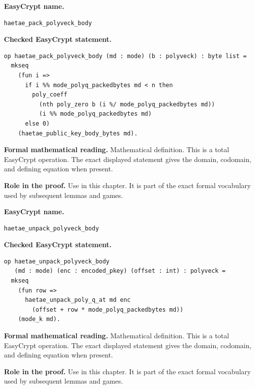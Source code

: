\begin{formaldefinition}
\noindent\textbf{EasyCrypt name.}
\begin{lstlisting}[language=EasyCrypt,basicstyle=\ttfamily\scriptsize]
haetae_pack_polyveck_body
\end{lstlisting}
\noindent\textbf{Checked EasyCrypt statement.}
\begin{lstlisting}[language=EasyCrypt,basicstyle=\ttfamily\scriptsize]
op haetae_pack_polyveck_body (md : mode) (b : polyveck) : byte list =
  mkseq
    (fun i =>
      if i %% mode_polyq_packedbytes md < n then
        poly_coeff
          (nth poly_zero b (i %/ mode_polyq_packedbytes md))
          (i %% mode_polyq_packedbytes md)
      else 0)
    (haetae_public_key_body_bytes md).
\end{lstlisting}
\noindent\textbf{Formal mathematical reading.}
Mathematical definition. This is a total EasyCrypt operation.  The exact displayed statement gives the domain, codomain, and defining equation when present.

\noindent\textbf{Role in the proof.}
Use in this chapter. It is part of the exact formal vocabulary used by subsequent lemmas and games.

\end{formaldefinition}

\begin{formaldefinition}
\noindent\textbf{EasyCrypt name.}
\begin{lstlisting}[language=EasyCrypt,basicstyle=\ttfamily\scriptsize]
haetae_unpack_polyveck_body
\end{lstlisting}
\noindent\textbf{Checked EasyCrypt statement.}
\begin{lstlisting}[language=EasyCrypt,basicstyle=\ttfamily\scriptsize]
op haetae_unpack_polyveck_body
   (md : mode) (enc : encoded_pkey) (offset : int) : polyveck =
  mkseq
    (fun row =>
      haetae_unpack_poly_q_at md enc
        (offset + row * mode_polyq_packedbytes md))
    (mode_k md).
\end{lstlisting}
\noindent\textbf{Formal mathematical reading.}
Mathematical definition. This is a total EasyCrypt operation.  The exact displayed statement gives the domain, codomain, and defining equation when present.

\noindent\textbf{Role in the proof.}
Use in this chapter. It is part of the exact formal vocabulary used by subsequent lemmas and games.

\end{formaldefinition}


